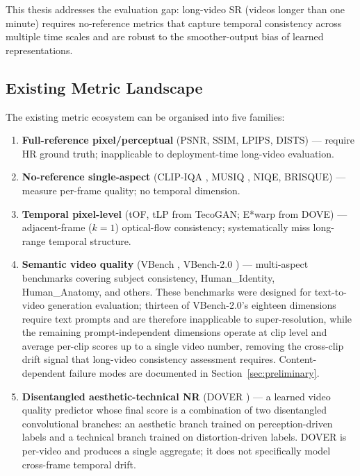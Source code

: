This thesis addresses the evaluation gap: long-video SR (videos longer than one minute) requires
no-reference metrics that capture temporal consistency across multiple time scales and are robust to
the smoother-output bias of learned representations.

\subsection{Existing Metric Landscape}

The existing metric ecosystem can be organised into five families:

\begin{enumerate}
    \item \textbf{Full-reference pixel/perceptual} (PSNR, SSIM, LPIPS, DISTS) --- require HR ground truth;
          inapplicable to deployment-time long-video evaluation.
    \item \textbf{No-reference single-aspect} (CLIP-IQA \cite{wang_clipiqa_2023}, MUSIQ \cite{ke_musiq_2021},
          NIQE, BRISQUE) --- measure per-frame quality; no temporal dimension.
    \item \textbf{Temporal pixel-level} (tOF, tLP from TecoGAN; E*warp from DOVE) --- adjacent-frame
          ($k{=}1$) optical-flow consistency; systematically miss long-range temporal structure.
    \item \textbf{Semantic video quality} (VBench \cite{huang_vbench_2024}, VBench-2.0
          \cite{huang_vbench2_2025}) --- multi-aspect benchmarks covering subject consistency,
          Human\_Identity, Human\_Anatomy, and others. These benchmarks were designed for
          text-to-video generation evaluation; thirteen of VBench-2.0's eighteen dimensions
          require text prompts and are therefore inapplicable to super-resolution, while the
          remaining prompt-independent dimensions operate at clip level and average per-clip
          scores up to a single video number, removing the cross-clip drift signal that
          long-video consistency assessment requires. Content-dependent failure modes are
          documented in Section~\ref{sec:preliminary}.
    \item \textbf{Disentangled aesthetic-technical NR} (DOVER \cite{wu_dover_2023}) ---
          a learned video quality predictor whose final score is a combination of two
          disentangled convolutional branches: an aesthetic branch trained on perception-driven
          labels and a technical branch trained on distortion-driven labels. DOVER is per-video
          and produces a single aggregate; it does not specifically model cross-frame
          temporal drift.
\end{enumerate}


